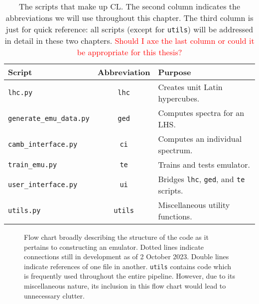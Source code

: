 \begin{table}[ht!]
\centering
\begin{tabular}{l|c|l}
\hline
Script & Abbreviation & Purpose \\ \hline
\Verb|lhc.py| & \texttt{lhc} & Creates unit Latin hypercubes. \\
\Verb|generate_emu_data.py| & \texttt{ged} & Computes spectra for an LHS.\\
\Verb|camb_interface.py| & \texttt{ci} & Computes an individual spectrum. \\
\Verb|train_emu.py| & \texttt{te} & Trains and tests emulator. \\
\Verb|user_interface.py| & \texttt{ui} & Bridges
	\texttt{lhc}, \texttt{ged}, and \texttt{te} scripts. \\
\Verb|utils.py| & \texttt{utils} & Miscellaneous utility functions. 
\end{tabular}
 \cprotect\caption[Summary of CL Scripts]{The scripts that make up CL.
 	The second column indicates the abbreviations we will use throughout this 
 	chapter. The third column is just
 	for quick reference: all scripts (except for \texttt{utils}) will be
 	addressed in detail in these two chapters. \textcolor{red}{Should I axe
 	the last column or could it be appropriate for this thesis?}}
 \label{tab: script_summary}
\end{table}

\begin{figure}[ht!]
    \centering
 	
 	\caption[CL Flow Chart]{Flow chart broadly describing the structure
 		of the
 		code as it pertains to constructing an emulator. Dotted lines
 		indicate connections still in development as of 2 October 2023.
 		Double lines indicate references of one file in another.
 		\Verb|utils| contains code which is frequently used throughout
 		the entire pipeline. However, due to its miscellaneous nature, its
 		inclusion in this flow chart would lead to unnecessary clutter.}
 	\label{fig: flow_chart}
\end{figure}
